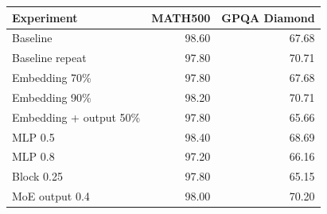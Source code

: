 \begin{tabular}{lrr}
\toprule
Experiment & MATH500 & GPQA Diamond \\
\midrule
Baseline & 98.60 & 67.68 \\
Baseline repeat & 97.80 & 70.71 \\
Embedding 70\% & 97.80 & 67.68 \\
Embedding 90\% & 98.20 & 70.71 \\
Embedding + output 50\% & 97.80 & 65.66 \\
MLP 0.5 & 98.40 & 68.69 \\
MLP 0.8 & 97.20 & 66.16 \\
Block 0.25 & 97.80 & 65.15 \\
MoE output 0.4 & 98.00 & 70.20 \\
\bottomrule
\end{tabular}
